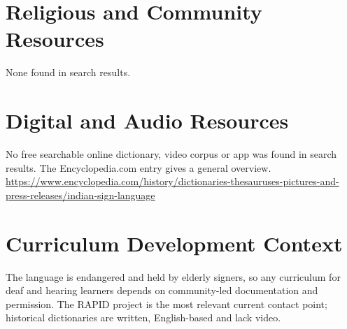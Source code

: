 \documentclass[12pt]{article}
\begin{document}
\section{Religious and Community Resources}
None found in search results.

\section{Digital and Audio Resources}
No free searchable online dictionary, video corpus or app was found in search results. The Encyclopedia.com entry gives a general overview. \url{https://www.encyclopedia.com/history/dictionaries-thesauruses-pictures-and-press-releases/indian-sign-language}

\section{Curriculum Development Context}
The language is endangered and held by elderly signers, so any curriculum for deaf and hearing learners depends on community-led documentation and permission. The RAPID project is the most relevant current contact point; historical dictionaries are written, English-based and lack video.
\end{document}
